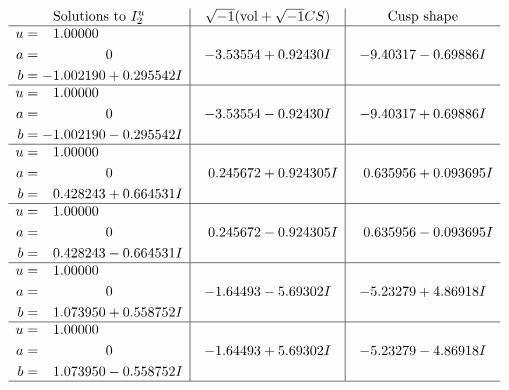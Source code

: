 \documentclass[1p]{elsarticle_modified}
\theoremstyle{definition}
\newcommand{\I}{\sqrt{-1}}
\begin{document}
$$\begin{array}{c|c|c}  
\text{Solutions to }I^u_{2}& \I (\text{vol} + \sqrt{-1}CS) & \text{Cusp shape}\\
 \hline 
\begin{aligned}
u &= \phantom{-}1.00000\phantom{ +0.000000I} \\
a &= \phantom{-0.000000 } 0 \\
b &= -1.002190 + 0.295542 I\end{aligned}
 & -3.53554 + 0.92430 I & -9.40317 - 0.69886 I \\ \hline\begin{aligned}
u &= \phantom{-}1.00000\phantom{ +0.000000I} \\
a &= \phantom{-0.000000 } 0 \\
b &= -1.002190 - 0.295542 I\end{aligned}
 & -3.53554 - 0.92430 I & -9.40317 + 0.69886 I \\ \hline\begin{aligned}
u &= \phantom{-}1.00000\phantom{ +0.000000I} \\
a &= \phantom{-0.000000 } 0 \\
b &= \phantom{-}0.428243 + 0.664531 I\end{aligned}
 & \phantom{-}0.245672 + 0.924305 I & \phantom{-}0.635956 + 0.093695 I \\ \hline\begin{aligned}
u &= \phantom{-}1.00000\phantom{ +0.000000I} \\
a &= \phantom{-0.000000 } 0 \\
b &= \phantom{-}0.428243 - 0.664531 I\end{aligned}
 & \phantom{-}0.245672 - 0.924305 I & \phantom{-}0.635956 - 0.093695 I \\ \hline\begin{aligned}
u &= \phantom{-}1.00000\phantom{ +0.000000I} \\
a &= \phantom{-0.000000 } 0 \\
b &= \phantom{-}1.073950 + 0.558752 I\end{aligned}
 & -1.64493 - 5.69302 I & -5.23279 + 4.86918 I \\ \hline\begin{aligned}
u &= \phantom{-}1.00000\phantom{ +0.000000I} \\
a &= \phantom{-0.000000 } 0 \\
b &= \phantom{-}1.073950 - 0.558752 I\end{aligned}
 & -1.64493 + 5.69302 I & -5.23279 - 4.86918 I\\
 \hline 
 \end{array}$$\newpage
\end{document}
